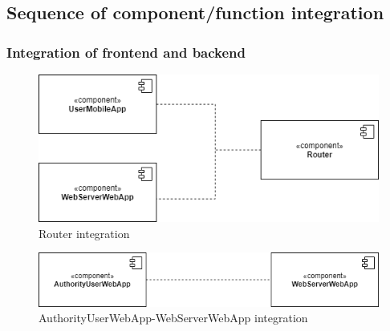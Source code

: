         \subsection{Sequence of component/function integration}

        \subsubsection{Integration of frontend and backend}
            \begin{figure}[H]
                \includegraphics[scale=0.7]{dd/resources/images/Integration-Router.png}
                \caption{Router integration}        
            \end{figure}
            \begin{figure}[H]
                \includegraphics[scale=0.65]{dd/resources/images/Integration-Web.png}
                \caption{AuthorityUserWebApp-WebServerWebApp integration}        
            \end{figure}

